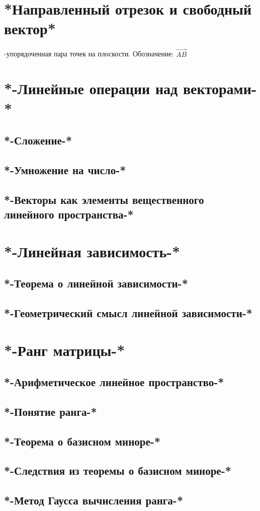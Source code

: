 \chapter{*Направленный отрезок и свободный вектор*}
\begin{opred}
-упорядоченная пара точек на плоскости. Обозначение: $\vec{AB}$
\end{opred}
\chapter{*-Линейные операции над векторами-*}
\section{*-Сложение-*}
\section{*-Умножение на число-*}
\section{*-Векторы как элементы вещественного линейного пространства-*}
\chapter{*-Линейная зависимость-*}
\section{*-Теорема о линейной зависимости-*}
\section{*-Геометрический смысл линейной зависимости-*}
\chapter{*-Ранг матрицы-*}
\section{*-Арифметическое линейное пространство-*}
\section{*-Понятие ранга-*}
\section{*-Теорема о базисном миноре-*}
\section{*-Следствия из теоремы о базисном миноре-*}
\section{*-Метод Гаусса вычисления ранга-*}
